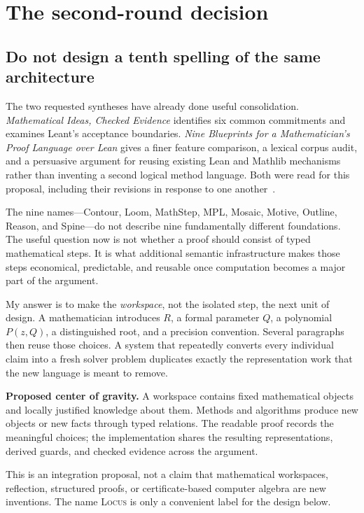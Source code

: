 \documentclass[11pt,letterpaper]{article}
\newcommand{\Locus}{\textsc{Locus}}
\theoremstyle{definition}
\theoremstyle{remark}
\begin{document}
\clearpage
\tableofcontents
\clearpage

\section{The second-round decision}
\label{sec:decision}

\subsection{Do not design a tenth spelling of the same architecture}
The two requested syntheses have already done useful consolidation.
\emph{Mathematical Ideas, Checked Evidence} identifies six common commitments
and examines Leant's acceptance boundaries. \emph{Nine Blueprints for a
Mathematician's Proof Language over Lean} gives a finer feature comparison,
a lexical corpus audit, and a persuasive argument for reusing existing Lean and
Mathlib mechanisms rather than inventing a second logical method language.
Both were read for this proposal, including their revisions in response to one
another~\cite{synthesis,blueprints}.

The nine names---Contour, Loom, MathStep, MPL, Mosaic, Motive, Outline, Reason,
and Spine---do not describe nine fundamentally different foundations. The useful
question now is not whether a proof should consist of typed mathematical steps.
It is what additional semantic infrastructure makes those steps economical,
predictable, and reusable once computation becomes a major part of the argument.

My answer is to make the \emph{workspace}, not the isolated step, the next unit of
design. A mathematician introduces $R$, a formal parameter $Q$, a polynomial
$P(z,Q)$, a distinguished root, and a precision convention. Several paragraphs
then reuse those choices. A system that repeatedly converts every individual
claim into a fresh solver problem duplicates exactly the representation work
that the new language is meant to remove.

\textbf{Proposed center of gravity.} A workspace contains fixed mathematical
objects and locally justified knowledge about them. Methods and algorithms
produce new objects or new facts through typed relations. The readable proof
records the meaningful choices; the implementation shares the resulting
representations, derived guards, and checked evidence across the argument.

This is an integration proposal, not a claim that mathematical workspaces,
reflection, structured proofs, or certificate-based computer algebra are new
inventions. The name \Locus{} is only a convenient label for the design below.
\end{document}
